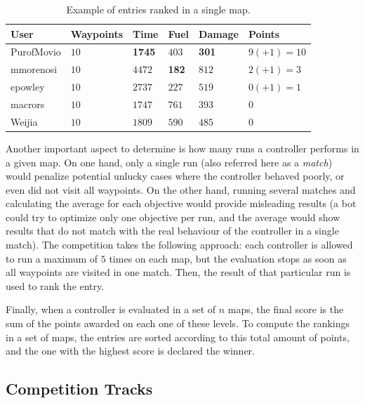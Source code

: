 \documentclass[conference]{IEEEtran}
\begin{document}
\begin{table}[!t]
\begin{center}
\begin{tabular}{|>{\centering\arraybackslash}m{1.25cm}|>{\centering\arraybackslash}m{1.15cm}|>{\centering\arraybackslash}m{0.5cm}|>{\centering\arraybackslash}m{0.5cm}|>{\centering\arraybackslash}m{0.9cm}|>{\centering\arraybackslash}m{1.5cm}|}
\hline
 \textbf{User} & \textbf{Waypoints} & \textbf{Time} & \textbf{Fuel} & \textbf{Damage} & \textbf{Points} \\ 
\hline
PurofMovio & $10$ & \textbf{1745} & $403$ & \textbf{301} & $9 (+1) = 10$\\
\hline
mmorenosi & $10$ & $4472$ & \textbf{182} & $812$ & $2 (+1) = 3$\\
\hline
epowley & $10$ & $2737$ & $227$ & $519$ & $0 (+1) = 1$\\
\hline
\hline
macrors & $10$ & $1747$ & $761$ & $393$ & $0$\\
\hline
Weijia & $10$ & $1809$ & $590$ & $485$ & $0$\\
\hline
\end{tabular}
\caption{Example of entries ranked in a single map. }
\label{tab:rankingSample}
\end{center}
\end{table}

Another important aspect to determine is how many runs a controller performs in a given map. On one hand, only a single run (also referred here as a \textit{match}) would penalize potential unlucky cases where the controller behaved poorly, or even did not visit all waypoints. On the other hand, running several matches and calculating the average for each objective would provide misleading results (a bot could try to optimize only one objective per run, and the average would show results that do not match with the real behaviour of the controller in a single match). The competition takes the following approach: each controller is allowed to run a maximum of $5$ times on each map, but the evaluation stops as soon as all waypoints are visited in one match. Then, the result of that particular run is used to rank the entry.

Finally, when a controller is evaluated in a set of $n$ maps, the final score is the sum of the points awarded on each one of these levels. To compute the rankings in a set of maps, the entries are sorted according to this total amount of points, and the one with the highest score is declared the winner.
	
	
\subsection{Competition Tracks}
\end{document}

